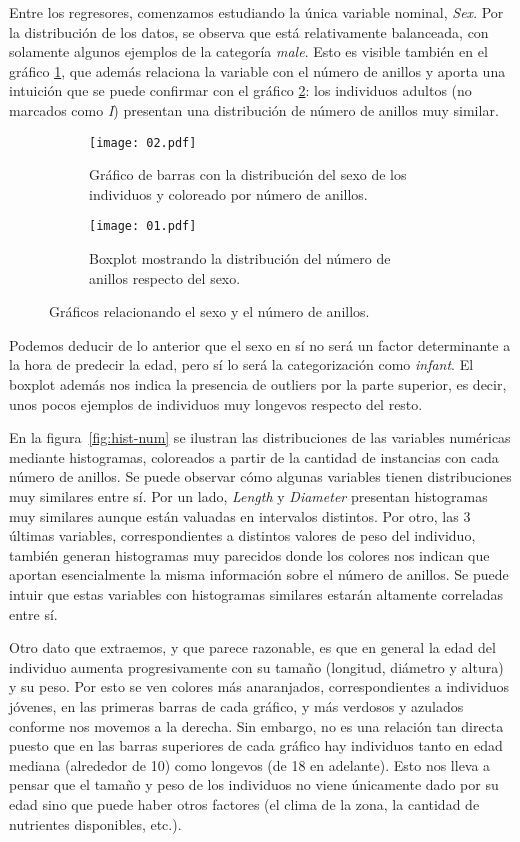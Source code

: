 \documentclass[a4paper, 11pt]{article}
\begin{document}
Entre los regresores, comenzamos estudiando la única variable nominal, \textit{Sex}. Por la distribución de los datos, se observa que está relativamente balanceada, con solamente algunos ejemplos de la categoría \textit{male}. Esto es visible también en el gráfico \ref{fig:bars-sex}, que además relaciona la variable con el número de anillos y aporta una intuición que se puede confirmar con el gráfico \ref{fig:boxplot-sex}: los individuos adultos (no marcados como \textit{I}) presentan una distribución de número de anillos muy similar.
\begin{figure}[ht]
  \begin{subfigure}{0.48\textwidth}
    \centering
    \texttt{[image: 02.pdf]}
    \caption{\label{fig:bars-sex}Gráfico de barras con la distribución del sexo de los individuos y coloreado por número de anillos.}
  \end{subfigure}
  \hfill
  \begin{subfigure}{0.48\textwidth}
    \centering
    \texttt{[image: 01.pdf]}
    \caption{\label{fig:boxplot-sex}Boxplot mostrando la distribución del número de anillos respecto del sexo.}
  \end{subfigure}
  \caption{\label{fig:sex}Gráficos relacionando el sexo y el número de anillos.}
\end{figure}


Podemos deducir de lo anterior que el sexo en sí no será un factor determinante a la hora de predecir la edad, pero sí lo será la categorización como \textit{infant}. El boxplot además nos indica la presencia de outliers por la parte superior, es decir, unos pocos ejemplos de individuos muy longevos respecto del resto.

En la figura~\ref{fig:hist-num} se ilustran las distribuciones de las variables numéricas mediante histogramas, coloreados a partir de la cantidad de instancias con cada número de anillos. Se puede observar cómo algunas variables tienen distribuciones muy similares entre sí. Por un lado, \textit{Length} y \textit{Diameter} presentan histogramas muy similares aunque están valuadas en intervalos distintos. Por otro, las 3 últimas variables, correspondientes a distintos valores de peso del individuo, también generan histogramas muy parecidos donde los colores nos indican que aportan esencialmente la misma información sobre el número de anillos. Se puede intuir que estas variables con histogramas similares estarán altamente correladas entre sí.

Otro dato que extraemos, y que parece razonable, es que en general la edad del individuo aumenta progresivamente con su tamaño (longitud, diámetro y altura) y su peso. Por esto se ven colores más anaranjados, correspondientes a individuos jóvenes, en las primeras barras de cada gráfico, y más verdosos y azulados conforme nos movemos a la derecha. Sin embargo, no es una relación tan directa puesto que en las barras superiores de cada gráfico hay individuos tanto en edad mediana (alrededor de 10) como longevos (de 18 en adelante). Esto nos lleva a pensar que el tamaño y peso de los individuos no viene únicamente dado por su edad sino que puede haber otros factores (el clima de la zona, la cantidad de nutrientes disponibles, etc.).
\end{document}
